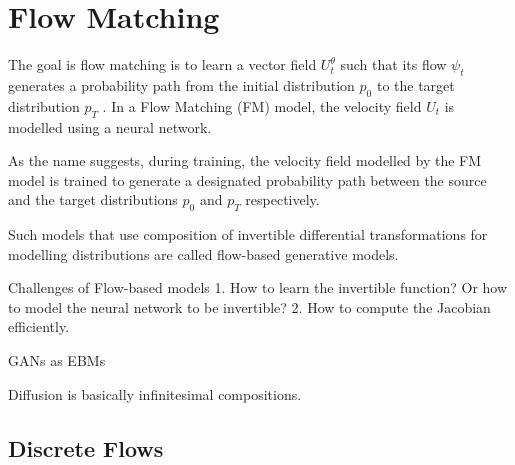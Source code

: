 \documentclass[a4paper, 11pt]{article}
\begin{document}
\section{Flow Matching}
The goal is flow matching is to learn a vector field $U_t^{\theta}$ such that its flow $\psi_t$ generates a probability path from the initial distribution $p_0$ to the target distribution $p_T$ \citep{lipman2024flow}. In a Flow Matching (FM) model, the velocity field $U_t$ is modelled using a neural network.



As the name suggests, during training, the velocity field modelled by the FM model is trained to generate a designated probability path between the source and the target distributions $p_0$ and $p_T$ respectively.


Such models that use composition of invertible differential transformations for modelling distributions are called flow-based generative models.

Challenges of Flow-based models 1. How to learn the invertible function? Or how to model the neural network to be invertible? 2. How to compute the Jacobian efficiently.


GANs as EBMs

\begin{center} 
\end{center} 


Diffusion is basically infinitesimal compositions.

\subsection{Discrete Flows}
\end{document}
